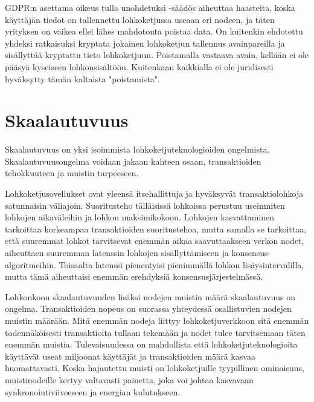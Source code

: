 \documentclass[utf8,bachelor]{gradu3}
\begin{document}
GDPR:n asettama oikeus tulla unohdetuksi -säädös aiheuttaa haasteita, koska käyttäjän tiedot on tallennettu lohkoketjussa useaan eri nodeen, ja täten yrityksen on vaikea ellei lähes mahdotonta poistaa data. On kuitenkin ehdotettu yhdeksi ratkaisuksi kryptata jokainen lohkoketjun tallennus avainpareilla ja sisällyttää kryptattu tieto lohkoketjuun. Poistamalla vastaava avain, kellään ei ole pääsyä kyseiseen lohkonsisältöön. Kuitenkaan kaikkialla ei ole juridisesti hyväksytty tämän kaltaista "poistamista". \parencite{ali2019blockchain}

\section{Skaalautuvuus}
Skaalautuvuus on yksi isoimmista lohkoketjuteknologioiden ongelmista. Skaalautuvuusongelma voidaan jakaan kahteen osaan, transaktioiden tehokkuuteen ja muistin tarpeeseen.

Lohkoketjusovellukset ovat yleensä itsehallittuja ja hyväksyvät transaktiolohkoja satunnaisin väliajoin.
Suoritusteho tälläisissä lohkoissa perustuu useinmiten lohkojen aikaväleihin ja lohkon maksimikokoon.
Lohkojen kasvattaminen tarkoittaa korkeampaa transaktioiden suoritustehoa, mutta samalla se tarkoittaa, että suuremmat lohkot tarvitsevat enemmän aikaa saavuttaakseen verkon nodet, aiheuttaen suuremman latenssin lohkojen sisällyttämiseen ja konsensus-algoritmeihin.
Toisaalta latenssi pienentyisi pienimmällä lohkon lisäysintervalilla, mutta tämä aiheuttaisi  enemmän erehdyksiä konsensusjärjestelmässä.

Lohkonkoon skaalautuvuuden lisäksi nodejen muistin määrä skaalautuvuus on ongelma. Transaktioiden nopeus on suorassa yhteydessä osallistuvien nodejen muistin määrään.
Mitä enemmän nodeja liittyy lohkoketjuverkkoon sitä enemmän todennäköisesti transaktioita tullaan tekemään ja nodet tulee tarvitsemaan täten enemmän muistia.
Tulevaisuudessa on mahdollista että lohkoketjuteknologioita käyttävät useat miljoonat käyttäjät ja transaktioiden määrä kasvaa huomattavasti.
Koska hajautettu muisti on lohkoketjuille tyypillinen ominaisuus, muistinodeille kertyy valtavasti painetta, joka voi johtaa kasvavaan synkronointiviiveeseen ja energian kulutukseen.

\end{document}
